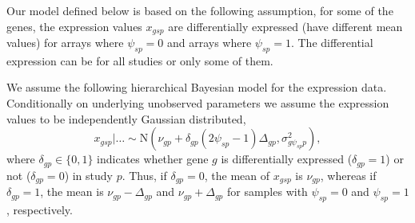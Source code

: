 \documentclass[11pt]{article}
\begin{document}
Our model defined below is based on the following assumption,
for some of the genes, the expression values $x_{gsp}$ are
differentially expressed (have different mean values)  
for arrays where $\psi_{sp}=0$ and 
arrays where $\psi_{sp}=1$. The differential expression
can be for all studies or only some of them.




We assume the following hierarchical Bayesian model for the 
expression data. Conditionally on underlying unobserved 
parameters we assume the expression values to be independently
Gaussian distributed,
\begin{equation}\label{x}
x_{gsp}|\ldots  \sim \mbox{N}(\nu_{gp} + \delta_{gp} (2\psi_{sp} - 1)\Delta_{gp},
\sigma^2_{g\psi_{sp}p}),
\end{equation}
where $\delta_{gp}\in \{ 0,1\}$ indicates whether gene $g$ is 
differentially expressed ($\delta_{gp}=1$) or not ($\delta_{gp}=0$) in study $p$.
Thus, if $\delta_{gp} = 0$, the mean of $x_{gsp}$ is $\nu_{gp}$, 
whereas if $\delta_{gp}=1$, the mean is $\nu_{gp}-\Delta_{gp}$ and
$\nu_{gp}+\Delta_{gp}$ for samples with $\psi_{sp}=0$ and $\psi_{sp}=1$,
respectively. 
\end{document}
